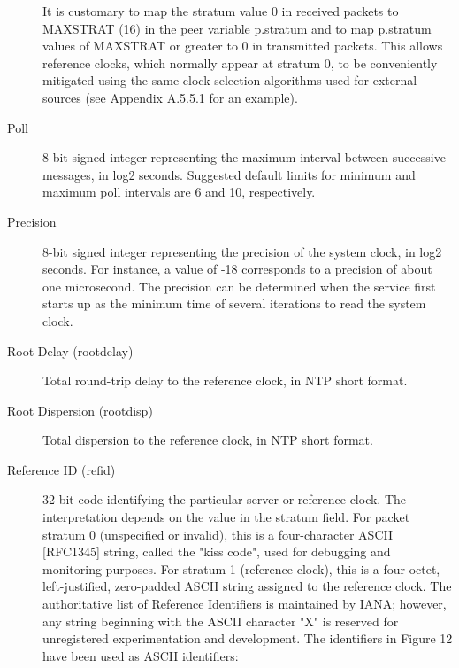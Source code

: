 \begin{description}
It is customary to map the stratum value 0 in received packets to
MAXSTRAT (16) in the peer variable p.stratum and to map p.stratum
values of MAXSTRAT or greater to 0 in transmitted packets. This
allows reference clocks, which normally appear at stratum 0, to be
conveniently mitigated using the same clock selection algorithms used
for external sources (see Appendix A.5.5.1 for an example).

\item[Poll] 8-bit signed integer representing the maximum interval between
successive messages, in log2 seconds. Suggested default limits for
minimum and maximum poll intervals are 6 and 10, respectively.

\item[Precision] 8-bit signed integer representing the precision of the
system clock, in log2 seconds. For instance, a value of -18
corresponds to a precision of about one microsecond. The precision
can be determined when the service first starts up as the minimum
time of several iterations to read the system clock.

\item[Root Delay (rootdelay)] Total round-trip delay to the reference
clock, in NTP short format.

\item[Root Dispersion (rootdisp)] Total dispersion to the reference clock,
in NTP short format.

\item[Reference ID (refid)] 32-bit code identifying the particular server
or reference clock. The interpretation depends on the value in the
stratum field. For packet stratum 0 (unspecified or invalid), this
is a four-character ASCII [RFC1345] string, called the "kiss code",
used for debugging and monitoring purposes. For stratum 1 (reference
clock), this is a four-octet, left-justified, zero-padded ASCII
string assigned to the reference clock. The authoritative list of
Reference Identifiers is maintained by IANA; however, any string
beginning with the ASCII character "X" is reserved for unregistered
experimentation and development. The identifiers in Figure 12 have
been used as ASCII identifiers:


\end{description}

